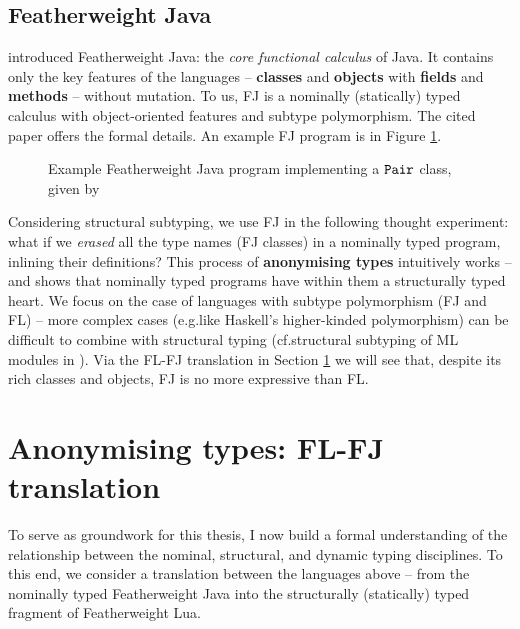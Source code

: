 \subsection{Featherweight Java}
\label{subsec:featherweight-java}

\textcite{featherweight-java} introduced Featherweight Java: the \emph{core functional calculus} of Java. It contains only the key features of the languages -- \textbf{classes} and \textbf{objects} with \textbf{fields} and \textbf{methods} -- without mutation. To us, FJ is a nominally (statically) typed calculus with object-oriented features and subtype polymorphism. The cited paper offers the formal details. An example FJ program is in Figure \ref{fig:featherweight-java}.

\begin{figure}
    \centering
    
    \caption{Example Featherweight Java program implementing a $\texttt{Pair}$ class, given by \textcite{featherweight-java}}
    \label{fig:featherweight-java}
\end{figure}

Considering structural subtyping, we use FJ in the following thought experiment: what if we \emph{erased} all the type names (FJ classes) in a nominally typed program, inlining their definitions? This process of \textbf{anonymising types} intuitively works -- and shows that nominally typed programs have within them a structurally typed heart. We focus on the case of languages with subtype polymorphism (FJ and FL) -- more complex cases (e.g.\@ like Haskell's higher-kinded polymorphism) can be difficult to combine with structural typing (cf.\@ structural subtyping of ML modules in \textcite{modular-implicits}).
Via the FL-FJ translation in Section \ref{sec:translations} we will see that, despite its rich classes and objects, FJ is no more expressive than FL.

\section{Anonymising types: FL-FJ translation}
\label{sec:translations}

To serve as groundwork for this thesis, I now build a formal understanding of the relationship between the nominal, structural, and dynamic typing disciplines. To this end, we consider a translation between the languages above -- from the nominally typed Featherweight Java into the structurally (statically) typed fragment of Featherweight Lua. 

